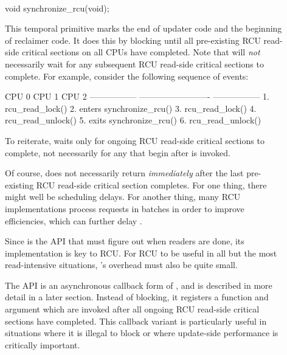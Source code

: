 \begin{description}
\item[] {~}

\begin{VerbatimU}
	void synchronize_rcu(void);
\end{VerbatimU}

	This temporal primitive marks the end of updater code and the
	beginning of reclaimer code.
	It does this by blocking until
	all pre-existing RCU read-side critical sections on all CPUs
	have completed.
	Note that  will \emph{not}
	necessarily wait for any subsequent RCU read-side critical
	sections to complete.
	For example, consider the following
	sequence of events:

\begin{VerbatimU}[gobble=1]
	         CPU 0                   CPU 1                  CPU 2
	     -----------------  -------------------------  -----------------
	 1.  rcu_read_lock()
	 2.                     enters synchronize_rcu()
	 3.                                                rcu_read_lock()
	 4.  rcu_read_unlock()
	 5.                     exits synchronize_rcu()
	 6.                                                rcu_read_unlock()
\end{VerbatimU}

	To reiterate,  waits only for ongoing RCU
	read-side critical sections to complete, not necessarily for
	any that begin after  is invoked.

	Of course,  does not necessarily return
	\emph{immediately} after the last pre-existing RCU read-side critical
	section completes.
	For one thing, there might well be scheduling
	delays.
	For another thing, many RCU implementations process
	requests in batches in order to improve efficiencies, which can
	further delay .

	Since  is the API that must figure out when
	readers are done, its implementation is key to RCU\@.
	For RCU
	to be useful in all but the most read-intensive situations,
	's overhead must also be quite small.

	The  API is an asynchronous callback form of
	, and is described in more detail in a later
	section.
	Instead of blocking, it registers a function and
	argument which are invoked after all ongoing RCU read-side
	critical sections have completed.
	This callback variant is
	particularly useful in situations where it is illegal to block
	or where update-side performance is critically important.


\end{description}
